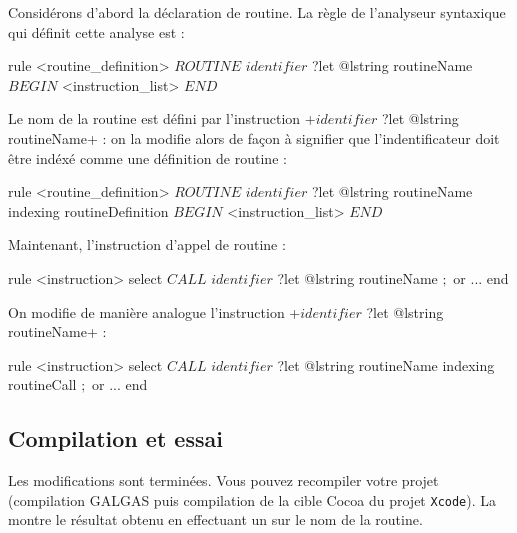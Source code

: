 Considérons d'abord la déclaration de routine. La règle de l'analyseur syntaxique qui définit cette analyse est :

\begin{galgas}
rule <routine_definition> {
  $ROUTINE$
  $identifier$ ?let @lstring routineName
  $BEGIN$
  <instruction_list>
  $END$
}
\end{galgas}

Le nom de la routine est défini par l'instruction \ggs+$identifier$ ?let @lstring routineName+ : on la modifie alors de façon à signifier que l'indentificateur doit être indéxé comme une définition de routine :

\begin{galgas}
rule <routine_definition> {
  $ROUTINE$
  $identifier$ ?let @lstring routineName indexing routineDefinition
  $BEGIN$
  <instruction_list>
  $END$
}
\end{galgas}

Maintenant, l'instruction d'appel de routine :

\begin{galgas}
rule <instruction> {
  select
    $CALL$
    $identifier$ ?let @lstring routineName
    $;$
  or
    ...
  end
}
\end{galgas}

On modifie de manière analogue l'instruction \ggs+$identifier$ ?let @lstring routineName+ :

\begin{galgas}
rule <instruction> {
  select
    $CALL$
    $identifier$ ?let @lstring routineName indexing routineCall
    $;$
  or
    ...
  end
}
\end{galgas}



\subsection{Compilation et essai}

Les modifications sont terminées. Vous pouvez recompiler votre projet (compilation GALGAS puis compilation de la cible Cocoa du projet \texttt{Xcode}). La  montre le résultat obtenu en effectuant un  sur le nom de la routine.


